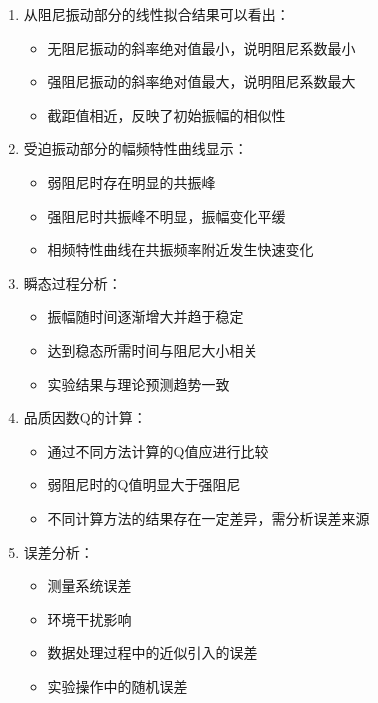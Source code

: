 \documentclass[UTF8]{ctexart}
\begin{document}
\begin{enumerate}
\item 从阻尼振动部分的线性拟合结果可以看出：
\begin{itemize}
\item 无阻尼振动的斜率绝对值最小，说明阻尼系数最小
\item 强阻尼振动的斜率绝对值最大，说明阻尼系数最大
\item 截距值相近，反映了初始振幅的相似性
\end{itemize}

\item 受迫振动部分的幅频特性曲线显示：
\begin{itemize}
\item 弱阻尼时存在明显的共振峰
\item 强阻尼时共振峰不明显，振幅变化平缓
\item 相频特性曲线在共振频率附近发生快速变化
\end{itemize}

\item 瞬态过程分析：
\begin{itemize}
\item 振幅随时间逐渐增大并趋于稳定
\item 达到稳态所需时间与阻尼大小相关
\item 实验结果与理论预测趋势一致
\end{itemize}

\item 品质因数Q的计算：
\begin{itemize}
\item 通过不同方法计算的Q值应进行比较
\item 弱阻尼时的Q值明显大于强阻尼
\item 不同计算方法的结果存在一定差异，需分析误差来源
\end{itemize}

\item 误差分析：
\begin{itemize}
\item 测量系统误差
\item 环境干扰影响
\item 数据处理过程中的近似引入的误差
\item 实验操作中的随机误差
\end{itemize}
\end{enumerate}
\end{document}
